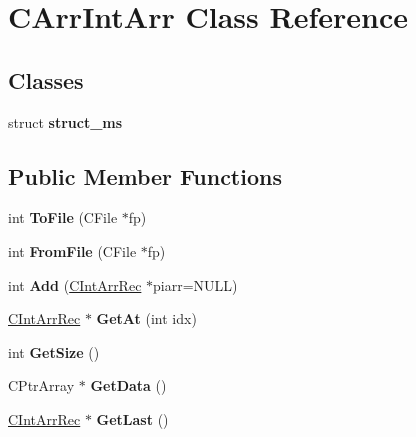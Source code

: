 \hypertarget{class_c_arr_int_arr}{\section{C\-Arr\-Int\-Arr Class Reference}
\label{class_c_arr_int_arr}
}
\subsection*{Classes}
\begin{DoxyCompactItemize}
\item 
struct {\bfseries struct\-\_\-ms}
\end{DoxyCompactItemize}
\subsection*{Public Member Functions}
\begin{DoxyCompactItemize}
\item 
\hypertarget{class_c_arr_int_arr_a7b0c0e26e344fb4b2b3d7b3fec0259e3}{int {\bfseries To\-File} (C\-File $\ast$fp)}\label{class_c_arr_int_arr_a7b0c0e26e344fb4b2b3d7b3fec0259e3}

\item 
\hypertarget{class_c_arr_int_arr_a2b5d14ee3ac58bb4105eb75ff9fcbd67}{int {\bfseries From\-File} (C\-File $\ast$fp)}\label{class_c_arr_int_arr_a2b5d14ee3ac58bb4105eb75ff9fcbd67}

\item 
\hypertarget{class_c_arr_int_arr_aaf5e106aefc071b972324eca6c0e55d9}{int {\bfseries Add} (\hyperlink{class_c_int_arr_rec}{C\-Int\-Arr\-Rec} $\ast$piarr=N\-U\-L\-L)}\label{class_c_arr_int_arr_aaf5e106aefc071b972324eca6c0e55d9}

\item 
\hypertarget{class_c_arr_int_arr_a6829af27da06a60a63bd33254dd590b7}{\hyperlink{class_c_int_arr_rec}{C\-Int\-Arr\-Rec} $\ast$ {\bfseries Get\-At} (int idx)}\label{class_c_arr_int_arr_a6829af27da06a60a63bd33254dd590b7}

\item 
\hypertarget{class_c_arr_int_arr_a2b1749edf360e0c82cd3b2a8cda97b6d}{int {\bfseries Get\-Size} ()}\label{class_c_arr_int_arr_a2b1749edf360e0c82cd3b2a8cda97b6d}

\item 
\hypertarget{class_c_arr_int_arr_abd4ca27b4069c1c64193e830fe8b570a}{C\-Ptr\-Array $\ast$ {\bfseries Get\-Data} ()}\label{class_c_arr_int_arr_abd4ca27b4069c1c64193e830fe8b570a}

\item 
\hypertarget{class_c_arr_int_arr_a91e773f46a54ff2aa6053d1f05e3d386}{\hyperlink{class_c_int_arr_rec}{C\-Int\-Arr\-Rec} $\ast$ {\bfseries Get\-Last} ()}\label{class_c_arr_int_arr_a91e773f46a54ff2aa6053d1f05e3d386}

\end{DoxyCompactItemize}
